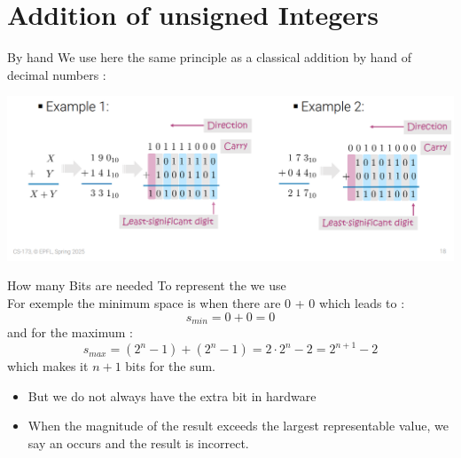 
\section{Addition of unsigned Integers}
\begin{parag}{By hand}
    We use here the same principle as a classical addition by hand of decimal numbers : 
\end{parag}
    \begin{center}
    \includegraphics[scale=0.4]{Capture d’écran (112).png}
    \end{center}
\begin{parag}{How many Bits are needed}
    To represent the  we use 
    \\
    For exemple the minimum space is when there are $0$ + $0$ which leads to : 
    \[s_{min} = 0 + 0 = 0\]
    and for the maximum : 
    \[s_{max} = (2^n - 1 ) + (2^n - 1) = 2\cdot 2^n -2 = 2^{n+1} - 2\]
    which makes it $n + 1$ bits for the sum.
    \begin{itemize}
        \item But we do not always have the extra bit in hardware
        \item When the magnitude of the result exceeds the largest representable value,  we say an  occurs and the result is incorrect.
    \end{itemize}
\end{parag}    
